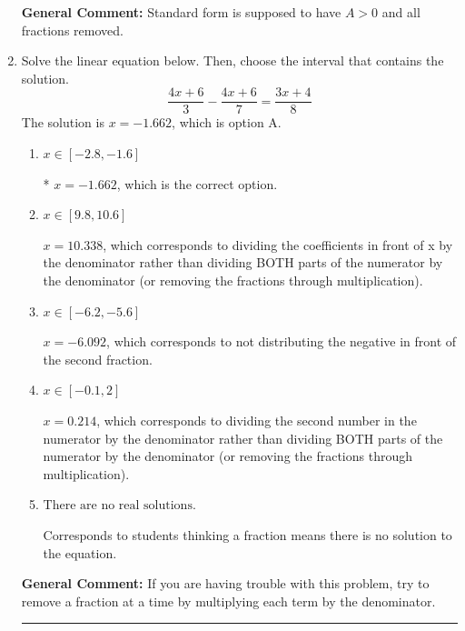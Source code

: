 \documentclass{extbook}[14pt]
\newcommand{\litem}[1]{\item #1

\rule{\textwidth}{0.4pt}}
\begin{document}
\begin{enumerate}
{\textbf{General Comment:} Standard form is supposed to have $A > 0$ and all fractions removed.
}
\litem{
Solve the linear equation below. Then, choose the interval that contains the solution.
\[ \frac{4x + 6}{3} - \frac{4x + 6}{7} = \frac{3x + 4}{8} \]The solution is \( x = -1.662 \), which is option A.\begin{enumerate}[label=\Alph*.]
\item \( x \in [-2.8, -1.6] \)

* $x = -1.662$, which is the correct option.
\item \( x \in [9.8, 10.6] \)

 $x = 10.338$, which corresponds to dividing the coefficients in front of x by the denominator rather than dividing BOTH parts of the numerator by the denominator (or removing the fractions through multiplication).
\item \( x \in [-6.2, -5.6] \)

 $x = -6.092$, which corresponds to not distributing the negative in front of the second fraction.
\item \( x \in [-0.1, 2] \)

 $x = 0.214$, which corresponds to dividing the second number in the numerator by the denominator rather than dividing BOTH parts of the numerator by the denominator (or removing the fractions through multiplication).
\item \( \text{There are no real solutions.} \)

Corresponds to students thinking a fraction means there is no solution to the equation.
\end{enumerate}

\textbf{General Comment:} If you are having trouble with this problem, try to remove a fraction at a time by multiplying each term by the denominator.
}
\end{enumerate}
\end{document}
